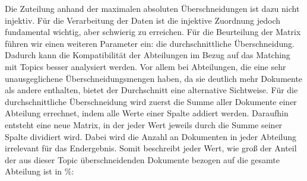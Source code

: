 \documentclass[german,version-2020-11]{uzl-thesis}
\begin{document}
Die Zuteilung anhand der maximalen absoluten Überschneidungen ist dazu nicht injektiv. Für die Verarbeitung der Daten ist die injektive Zuordnung jedoch fundamental wichtig, aber schwierig zu erreichen. Für die Beurteilung der Matrix führen wir einen weiteren Parameter ein: die durchschnittliche Überschneidung. Dadurch kann die Kompatibilität der Abteilungen im Bezug auf das Matching mit Topics besser analysiert werden. Vor allem bei Abteilungen, die eine sehr unausgeglichene Überschneidungsmengen haben, da sie deutlich mehr Dokumente als andere enthalten, bietet der Durchschnitt eine alternative Sichtweise. Für die durchschnittliche Überschneidung wird zuerst die Summe aller Dokumente einer Abteilung errechnet, indem alle Werte einer Spalte addiert werden. Daraufhin entsteht eine neue Matrix, in der jeder Wert jeweils durch die Summe seiner Spalte dividiert wird. Dabei wird die Anzahl an Dokumenten in jeder Abteilung irrelevant für das Endergebnis. Somit beschreibt jeder Wert, wie groß der Anteil der aus dieser Topic überschneidenden Dokumente bezogen auf die gesamte Abteilung ist in $\%$: \\
\end{document}
